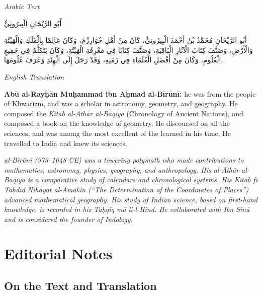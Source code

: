 \documentclass[11pt,a4paper]{article}
\newcommand{\cnote}[1]{\textcolor{notecolor}{\textit{#1}}}
\newenvironment{arabiccol}{%
  \begin{minipage}[t]{0.48\textwidth}%
  \begin{tcolorbox}[colback=leftbg,colframe=rulecolor,boxrule=0.4pt,arc=2pt,left=5pt,right=5pt,top=5pt,bottom=5pt]%
  \centering\textit{\footnotesize Arabic Text}\\[0.4em]%
  \raggedright\arabicfont\small%
}{%
  \end{tcolorbox}%
  \end{minipage}%
}
\newenvironment{englishcol}{%
  \begin{minipage}[t]{0.48\textwidth}%
  \begin{tcolorbox}[colback=rightbg,colframe=rulecolor,boxrule=0.4pt,arc=2pt,left=5pt,right=5pt,top=5pt,bottom=5pt]%
  \centering\textit{\footnotesize English Translation}\\[0.4em]%
  \raggedright\small%
}{%
  \end{tcolorbox}%
  \end{minipage}%
}
\begin{document}
\noindent
\begin{arabiccol}
\beginR
أَبُو الرَّيْحَانِ الْبِيرُونِيُّ

أَبُو الرَّيْحَانِ مُحَمَّدُ بْنُ أَحْمَدَ الْبِيرُونِيُّ، كَانَ مِنْ أَهْلِ خُوَارِزْمَ، وَكَانَ عَالِمًا بِالْفَلَكِ وَالْهَيْئَةِ وَالْأَرْضِ، وَصَنَّفَ كِتَابَ الْآثَارِ الْبَاقِيَةِ، وَصَنَّفَ كِتَابًا فِي مَعْرِفَةِ الْهَيْئَةِ، وَكَانَ يَتَكَلَّمُ فِي جَمِيعِ الْعُلُومِ، وَكَانَ مِنْ أَفْضَلِ الْعُلَمَاءِ فِي زَمَنِهِ، وَقَدْ رَحَلَ إِلَى الْهِنْدِ وَعَرَفَ عُلُومَهَا.
\endR
\end{arabiccol}
\hfill
\begin{englishcol}
\textbf{Abū al-Rayḥān Muḥammad ibn Aḥmad al-Bīrūnī:} he was from the people of Khwārizm, and was a scholar in astronomy, geometry, and geography. He composed the \textit{Kitāb al-Āthār al-Bāqiya} (Chronology of Ancient Nations), and composed a book on the knowledge of geometry. He discoursed on all the sciences, and was among the most excellent of the learned in his time. He travelled to India and knew its sciences.

\cnote{al-Bīrūnī (973--1048 CE) was a towering polymath who made contributions to mathematics, astronomy, physics, geography, and anthropology. His \textit{al-Āthār al-Bāqiya} is a comparative study of calendars and chronological systems. His \textit{Kitāb fī Taḥdīd Nihāyat al-Amākin} (``The Determination of the Coordinates of Places'') advanced mathematical geography. His study of Indian science, based on first-hand knowledge, is recorded in his \textit{Taḥqīq mā li-l-Hind}. He collaborated with Ibn Sīnā and is considered the founder of Indology.}
\end{englishcol}

\par\vspace{0.5em}

\newpage

\section{Editorial Notes}
\label{sec:editorial}

\subsection{On the Text and Translation}
\end{document}
